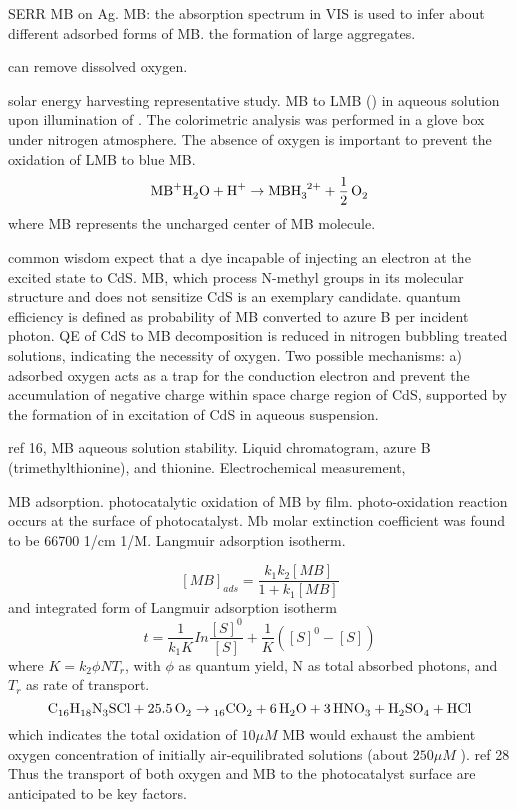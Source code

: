SERR MB on Ag. \cite{Nicolai2003}
MB: the absorption spectrum in VIS is used to infer about different adsorbed forms of MB. the formation of large aggregates. 

 can remove dissolved oxygen. \cite{Wang2014a}

solar energy harvesting representative study.\cite{Yoneyama1972} MB to LMB () in aqueous solution upon illumination of . The colorimetric analysis was performed in a glove box under nitrogen atmosphere. The absence of oxygen is important to prevent the oxidation of LMB to blue MB.
\[
\cee{MB^+ H2O + H^+ \rightarrow MBH3^{2+} + 1/2O2}
\]
where MB represents the uncharged center of MB molecule.

common wisdom expect that a dye incapable of injecting an electron at the excited state to CdS. MB, which process N-methyl groups in its molecular structure and does not sensitize CdS is an exemplary candidate. quantum efficiency is defined as probability of MB converted to azure B per incident photon. QE of CdS to MB decomposition is reduced in nitrogen bubbling treated solutions, indicating the necessity of oxygen. Two possible mechanisms: a) adsorbed oxygen acts as a trap for the conduction electron and prevent the accumulation of negative charge within space charge region of CdS, supported by the formation of  in excitation of CdS in aqueous suspension.\cite{Takizawa1978}

ref 16, MB aqueous solution stability. Liquid chromatogram, azure B (trimethylthionine), and thionine. Electrochemical measurement,

MB adsorption.  photocatalytic oxidation of MB by  film. photo-oxidation reaction occurs at the surface of photocatalyst. Mb molar extinction coefficient was found to be 66700 1/cm 1/M. Langmuir adsorption isotherm.\cite{Matthews1989}

\[
[MB]_{ads} = \frac{k_1 k_2 [MB]}{1 + k_1[MB]}
\]
and integrated form of Langmuir adsorption isotherm
\[
t = \frac{1}{k_1K} In\frac{[S]^0}{[S]} + \frac{1}{K}([S]^0 - [S])
\]
where $K = k_2 \phi N T_r$, with $\phi$ as quantum yield, N as total absorbed photons, and $T_r$ as rate of transport.
\[
\cee{C16H18N3SCl + 25.5O2 \rightarrow 16CO2 + 6H2O + 3HNO3 + H2SO4 +HCl}
\]
which indicates the total oxidation of $10 \mu M$ MB would exhaust the ambient oxygen concentration of initially air-equilibrated solutions (about $250 \mu M$ ). ref 28 Thus the transport of both oxygen and MB to the photocatalyst surface are anticipated to be key factors.

